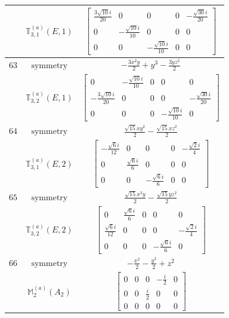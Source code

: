 \documentclass[fleqn,8pt,landscape]{jsarticle}
\begin{document}
\begin{longtable}{ccc}
$  $ & $ \mathbb{T}_{3,1}^{(a)}(E,1) $ & $ \begin{bmatrix} \frac{3 \sqrt{10} i}{20} & 0 & 0 & 0 & - \frac{\sqrt{30} i}{20} \\ 0 & - \frac{\sqrt{10} i}{10} & 0 & 0 & 0 \\ 0 & 0 & - \frac{\sqrt{10} i}{10} & 0 & 0 \end{bmatrix} $ \\ \hline
$ 63 $ & $ \text{symmetry} $ & $ - \frac{3 x^{2} y}{2} + y^{3} - \frac{3 y z^{2}}{2} $ \\
$  $ & $ \mathbb{T}_{3,2}^{(a)}(E,1) $ & $ \begin{bmatrix} 0 & - \frac{\sqrt{10} i}{10} & 0 & 0 & 0 \\ - \frac{3 \sqrt{10} i}{20} & 0 & 0 & 0 & - \frac{\sqrt{30} i}{20} \\ 0 & 0 & 0 & - \frac{\sqrt{10} i}{10} & 0 \end{bmatrix} $ \\ \hline
$ 64 $ & $ \text{symmetry} $ & $ \frac{\sqrt{15} x y^{2}}{2} - \frac{\sqrt{15} x z^{2}}{2} $ \\
$  $ & $ \mathbb{T}_{3,1}^{(a)}(E,2) $ & $ \begin{bmatrix} - \frac{\sqrt{6} i}{12} & 0 & 0 & 0 & - \frac{\sqrt{2} i}{4} \\ 0 & \frac{\sqrt{6} i}{6} & 0 & 0 & 0 \\ 0 & 0 & - \frac{\sqrt{6} i}{6} & 0 & 0 \end{bmatrix} $ \\ \hline
$ 65 $ & $ \text{symmetry} $ & $ \frac{\sqrt{15} x^{2} y}{2} - \frac{\sqrt{15} y z^{2}}{2} $ \\
$  $ & $ \mathbb{T}_{3,2}^{(a)}(E,2) $ & $ \begin{bmatrix} 0 & \frac{\sqrt{6} i}{6} & 0 & 0 & 0 \\ \frac{\sqrt{6} i}{12} & 0 & 0 & 0 & - \frac{\sqrt{2} i}{4} \\ 0 & 0 & 0 & - \frac{\sqrt{6} i}{6} & 0 \end{bmatrix} $ \\ \hline
$ 66 $ & $ \text{symmetry} $ & $ - \frac{x^{2}}{2} - \frac{y^{2}}{2} + z^{2} $ \\
$  $ & $ \mathbb{M}_{2}^{(a)}(A_{2}) $ & $ \begin{bmatrix} 0 & 0 & 0 & - \frac{i}{2} & 0 \\ 0 & 0 & \frac{i}{2} & 0 & 0 \\ 0 & 0 & 0 & 0 & 0 \end{bmatrix} $ \\ \hline

\end{longtable}
\end{document}
